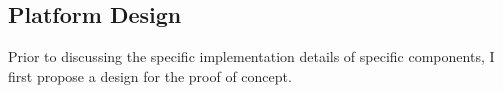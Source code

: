 \subsection{Platform Design}

Prior to discussing the specific implementation details of specific components, I first propose a design for the proof of concept.

\subsubsection{}



